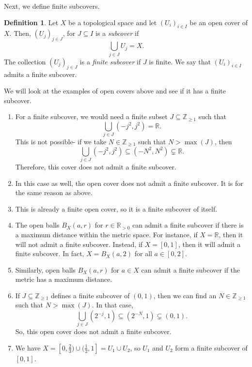 \documentclass[a4paper, openany]{memoir}
\theoremstyle{definition}
\newtheorem{definition}{Definition}[section]
\theoremstyle{plain}
\begin{document}
Next, we define finite subcovers.
\begin{definition}
Let $X$ be a topological space and let $(U_i)_{i \in I}$ be an open cover of $X$. Then, $(U_j)_{j \in J}$, for $J \subseteq I$ is a \emph{subcover} if
\[\bigcup_{j \in J} U_j = X.\]
The collection $(U_j)_{j \in J}$ is a \emph{finite subcover} if $J$ is finite. We say that $(U_i)_{i \in I}$ admits a finite subcover.
\end{definition}
We will look at the examples of open covers above and see if it has a finite subcover.
\begin{enumerate}
    \item For a finite subcover, we would need a finite subset $J \subseteq \mathbb{Z}_{\geqslant 1}$ such that
    \[\bigcup_{j \in J} (-j^2, j^2) = \mathbb{R}.\]
    This is not possible- if we take $N \in \mathbb{Z}_{\geqslant 1}$ such that $N > \max(J)$, then
    \[\bigcup_{j \in J} (-j^2, j^2) \subseteq (-N^2, N^2) \subsetneq \mathbb{R}.\]
    Therefore, this cover does not admit a finite subcover.
    
    \item In this case as well, the open cover does not admit a finite subcover. It is for the same reason as above.
    
    \item This is already a finite open cover, so it is a finite subcover of itself.
    
    \item The open balls $B_X(a, r)$ for $r \in \mathbb{R}_{> 0}$ can admit a finite subcover if there is a maximum distance within the metric space. For instance, if $X = \mathbb{R}$, then it will not admit a finite subcover. Instead, if $X = [0, 1]$, then it will admit a finite subcover. In fact, $X = B_X(a, 2)$ for all $a \in [0, 2]$.
    
    \item Similarly, open balls $B_X(a, r)$ for $a \in X$ can admit a finite subcover if the metric has a maximum distance.
    
    \item If $J \subseteq \mathbb{Z}_{\geqslant 1}$ defines a finite subcover of $(0, 1)$, then we can find an $N \in \mathbb{Z}_{\geqslant 1}$ such that $N > \max(J)$. In that case,
    \[\bigcup_{j \in J} (2^{-j}, 1) \subseteq (2^{-N}, 1) \subsetneq (0, 1).\]
    So, this open cover does not admit a finite subcover.
    
    \item We have $X = [0, \frac{2}{3}) \cup (\frac{1}{2}, 1] = U_1 \cup U_2$, so $U_1$ and $U_2$ form a finite subcover of $[0, 1]$.
\end{enumerate}
\end{document}
